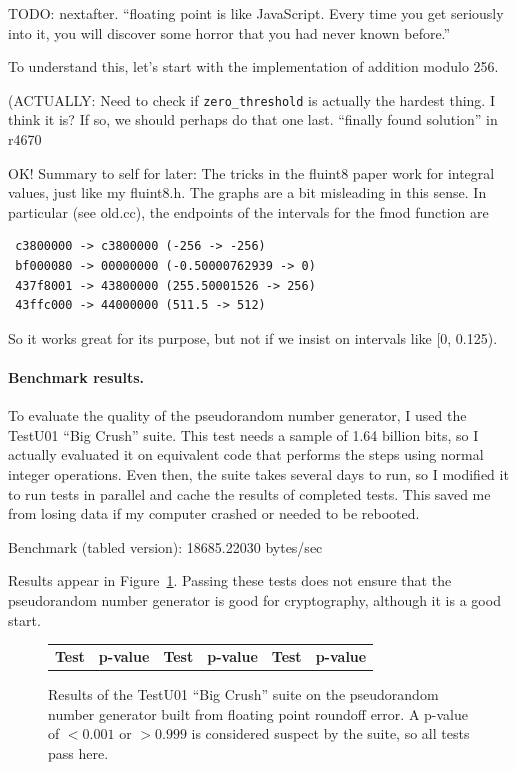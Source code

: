 \documentclass[twocolumn]{article}
\begin{document}
TODO: nextafter. ``floating point is like JavaScript. Every time you get seriously into it, you will discover some horror that you had never known before.''

To understand this, let's start with the implementation of addition modulo 256.

(ACTUALLY: Need to check if \verb+zero_threshold+ is actually the
hardest thing. I think it is? If so, we should perhaps do that one
last.
``finally found solution'' in r4670


OK! Summary to self for later: The tricks in the fluint8 paper work for integral values, just like my fluint8.h.
The graphs are a bit misleading in this sense. In particular (see old.cc), the endpoints of the intervals for the
fmod function are

\begin{lstlisting}
 c3800000 -> c3800000 (-256 -> -256)
 bf000080 -> 00000000 (-0.50000762939 -> 0)
 437f8001 -> 43800000 (255.50001526 -> 256)
 43ffc000 -> 44000000 (511.5 -> 512)
\end{lstlisting}

So it works great for its purpose, but not if we insist on intervals like [0, 0.125).


\paragraph{Benchmark results.}
To evaluate the quality of the pseudorandom number generator, I used the TestU01 ``Big Crush'' suite. This test needs a sample of 1.64 billion bits, so I actually evaluated it on equivalent code that performs the steps using normal integer operations. Even then, the suite takes several days to run, so I modified it to run tests in parallel and cache the results of completed tests. This saved me from losing data if my computer crashed or needed to be rebooted.

Benchmark (tabled version): 18685.22030 bytes/sec

Results appear in Figure~\ref{fig:testu01}. Passing these tests does
not ensure that the pseudorandom number generator is good for
cryptography, although it is a good start.

\begin{figure}[tp]
  \footnotesize
  \begin{tabular}{rl|rl|rl}
    {\bf Test} & {\bf p-value} &
    {\bf Test} & {\bf p-value} &
    {\bf Test} & {\bf p-value} \\
    
  \end{tabular}
  \caption{
    Results of the TestU01 ``Big Crush'' suite on the
    pseudorandom number generator built from floating point roundoff
    error. A p-value of $< 0.001$ or $> 0.999$ is considered
    suspect by the suite, so all tests pass here.
  } \label{fig:testu01}
\end{figure}
\end{document}
